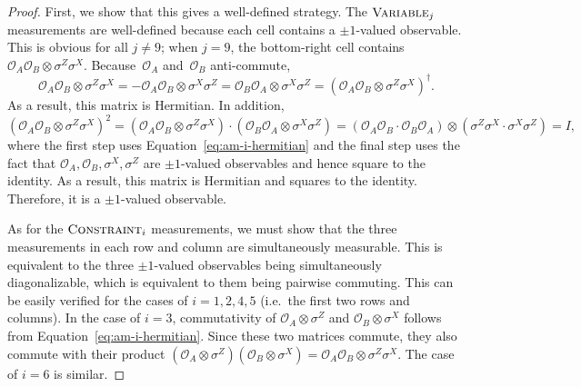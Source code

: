 \documentclass[11pt]{article}
\theoremstyle{definition}
\newcommand{\typestyle}[1]{\ensuremath{\textsc{#1}}\xspace}
\newcommand{\Constraint}{\typestyle{Constraint}}
\newcommand{\Variable}{\typestyle{Variable}}
\renewcommand{\cal}[1]{\mathcal{#1}}
\begin{document}
\begin{proof}
  First, we show that this gives a well-defined strategy.
  The $\Variable_j$ measurements are well-defined because each cell contains a $\pm 1$-valued observable.
  This is obvious for all $j \neq 9$;  when $j = 9$, the bottom-right cell contains $\cal{O}_A \cal{O}_B \otimes \sigma^Z \sigma^X$.
  Because~$\cal{O}_A$ and~$\cal{O}_B$ anti-commute,
  \begin{equation}\label{eq:am-i-hermitian}
  \cal{O}_A \cal{O}_B \otimes \sigma^Z \sigma^X
  = - \cal{O}_A \cal{O}_B \otimes \sigma^X \sigma^Z
  = \cal{O}_B \cal{O}_A \otimes \sigma^X \sigma^Z
  = (\cal{O}_A \cal{O}_B \otimes \sigma^Z \sigma^X)^\dagger.
  \end{equation}
  As a result, this matrix is Hermitian. In addition, 
  \begin{equation*}
  (\cal{O}_A \cal{O}_B \otimes \sigma^Z \sigma^X)^2
  = (\cal{O}_A \cal{O}_B \otimes \sigma^Z \sigma^X) \cdot (\cal{O}_B \cal{O}_A \otimes \sigma^X \sigma^Z)
  = (\cal{O}_A \cal{O}_B \cdot \cal{O}_B \cal{O}_A) \otimes (\sigma^Z \sigma^X \cdot \sigma^X \sigma^Z)
  = I,
  \end{equation*}
  where the first step uses Equation~\eqref{eq:am-i-hermitian}
  and the final step uses the fact that $\cal{O}_A, \cal{O}_B, \sigma^X, \sigma^Z$ are $\pm 1$-valued observables
  and hence square to the identity.
  As a result, this matrix
  is Hermitian and squares to the identity. Therefore, it is a $\pm 1$-valued observable.
  
  As for the $\Constraint_i$ measurements,
  we must show that the three measurements in each row and column are simultaneously measurable.
  This is equivalent to the three $\pm 1$-valued observables being simultaneously diagonalizable,
  which is equivalent to them being pairwise commuting. This can be easily verified for the cases of $i = 1, 2, 4, 5$
  (i.e.\ the first two rows and columns).
  In the case of $i = 3$, commutativity of $\cal{O}_A \otimes \sigma^Z$ and $\cal{O}_B \otimes \sigma^X$ 
  follows from Equation~\eqref{eq:am-i-hermitian}.
  Since these two matrices commute, they also commute with their product 
  $(\cal{O}_A \otimes \sigma^Z)(\cal{O}_B \otimes \sigma^X) = \cal{O}_A \cal{O}_B \otimes \sigma^Z \sigma^X$.
  The case of $i = 6$ is similar.
  

\end{proof}
\end{document}
